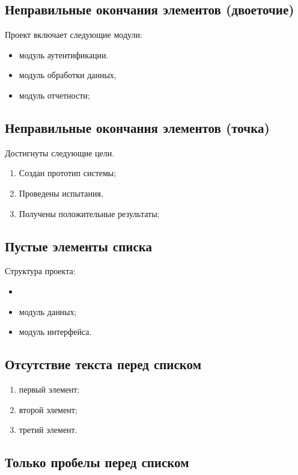 \documentclass{article}
\begin{document}
\subsection{Неправильные окончания элементов (двоеточие)}

Проект включает следующие модули:
\begin{itemize}
\item модуль аутентификации.
\item модуль обработки данных,
\item модуль отчетности;
\end{itemize}

\subsection{Неправильные окончания элементов (точка)}

Достигнуты следующие цели.
\begin{enumerate}
\item Создан прототип системы;
\item Проведены испытания,
\item Получены положительные результаты;
\end{enumerate}

\subsection{Пустые элементы списка}

Структура проекта:
\begin{itemize}
\item 
\item модуль данных;
\item модуль интерфейса.
\end{itemize}

\subsection{Отсутствие текста перед списком}

\begin{enumerate}
\item первый элемент;
\item второй элемент;
\item третий элемент.
\end{enumerate}

\subsection{Только пробелы перед списком}
\end{document}
